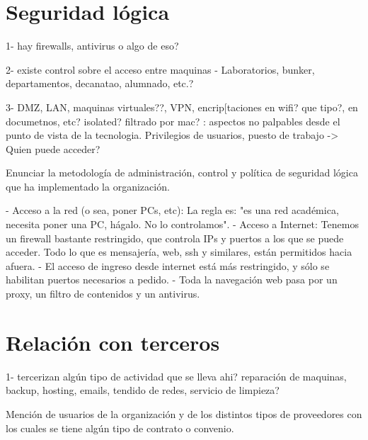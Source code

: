 \documentclass[10pt,a4paper,final]{article}
\begin{document}
\section{Seguridad lógica}
1- hay firewalls, antivirus o algo de eso?

2- existe control sobre el acceso entre maquinas - Laboratorios, bunker, departamentos, decanatao, alumnado, etc.?

3- DMZ, LAN, maquinas virtuales??, VPN, encrip[taciones en wifi? que tipo?, en documetnos, etc? isolated? filtrado por mac?
: aspectos no palpables desde el punto de vista de la tecnologia. Privilegios de usuarios, puesto de trabajo -> Quien puede acceder? 

Enunciar la metodología de administración, control y política de seguridad lógica que ha implementado la organización.

\begin{scriptsize}

- Acceso a la red (o sea, poner PCs, etc): La regla es: "es una red académica, necesita poner una PC, hágalo. No lo controlamos".
- Acceso a Internet: Tenemos un firewall bastante restringido, que controla IPs y puertos a los que se puede acceder. Todo lo que es mensajería, web, ssh y similares, están permitidos hacia afuera.
  - El acceso de ingreso desde internet está más restringido, y sólo se habilitan puertos necesarios a pedido.
- Toda la navegación web pasa por un proxy, un filtro de contenidos y un antivirus.
\end{scriptsize}

\section{Relación con terceros}
1- tercerizan algún tipo de actividad que se lleva ahi? reparación de maquinas, backup, hosting, emails, tendido de redes, servicio de limpieza?

Mención de usuarios de la organización y de los distintos tipos de proveedores con los cuales se tiene algún tipo de contrato o convenio.
\end{document}
